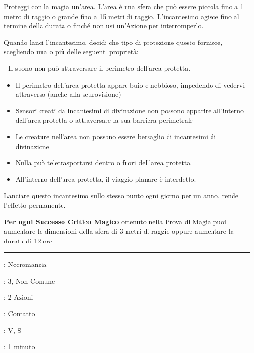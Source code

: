 \begin{multicols}{2}
Proteggi con la magia un'area. L'area è una sfera che può essere piccola fino a 1 metro di raggio o grande fino a 15 metri di raggio. L'incantesimo agisce fino al termine della durata o finché non usi un'Azione per interromperlo.

Quando lanci l'incantesimo, decidi che tipo di protezione questo fornisce, scegliendo una o più delle seguenti proprietà:

\noindent- Il suono non può attraversare il perimetro dell'area protetta.

\begin{itemize}[leftmargin=*] \setlength{\itemsep}{0pt}
	\item Il perimetro dell'area protetta appare buio e nebbioso, impedendo di vedervi attraverso (anche alla scurovisione)
	\item Sensori creati da incantesimi di divinazione non possono apparire all'interno dell'area protetta o attraversare la sua barriera perimetrale
	\item Le creature nell'area non possono essere bersaglio di incantesimi di divinazione
	\item Nulla può teletrasportarsi dentro o fuori dell'area protetta.
	\item All'interno dell'area protetta, il viaggio planare è interdetto.
\end{itemize}

Lanciare questo incantesimo sullo stesso punto ogni giorno per un anno, rende l'effetto permanente.

\textbf{Per ogni Successo Critico Magico} ottenuto nella Prova di Magia puoi aumentare le dimensioni della sfera di 3 metri di raggio oppure aumentare la durata di 12 ore.

\smallskip\noindent\rule{\linewidth}{2pt} \hypertarget{Scagliare Maledizione}{}\smallskip{}
\noindent
\begin{description}[noitemsep, topsep=0pt, parsep=0pt, partopsep=0pt, leftmargin=0cm, labelwidth=2.8cm]
	\item[\textbf{Lista di Magia}]: Necromanzia
	\item[\textbf{Livello}]: 3, Non Comune
	\item[\textbf{T. di Lancio}]: 2 Azioni
	\item[\textbf{Gittata}]: Contatto
	\item[\textbf{Componenti}]: V, S
	\item[\textbf{Durata}]: 1 minuto
\end{description}


\end{multicols}
